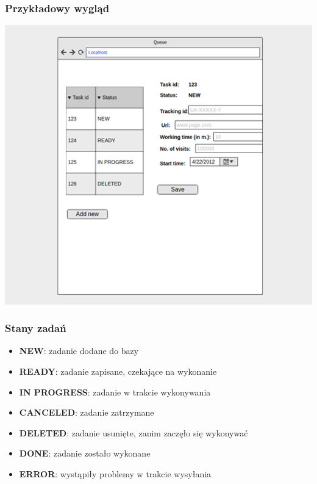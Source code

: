 \documentclass{article}
\begin{document}
\subsubsection{Przykładowy wygląd}
\begin{center}\includegraphics[scale=0.75]{ui}\end{center}

\subsubsection{Stany zadań}

\begin{itemize}
\item \textbf{NEW}: zadanie dodane do bazy
\item \textbf{READY}: zadanie zapisane, czekające na wykonanie
\item \textbf{IN PROGRESS}: zadanie w trakcie wykonywania
\item \textbf{CANCELED}: zadanie zatrzymane
\item \textbf{DELETED}: zadanie usunięte, zanim zaczęło się wykonywać
\item \textbf{DONE}: zadanie zostało wykonane
\item \textbf{ERROR}: wystąpiły problemy w trakcie wysyłania
\end{itemize}
\end{document}
